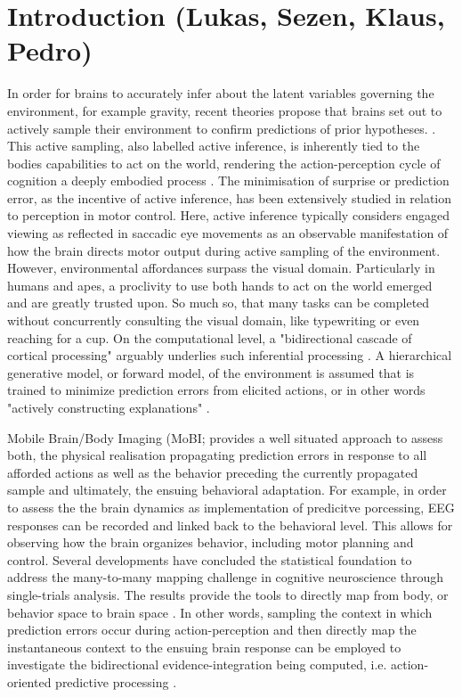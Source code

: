 \section{Introduction (Lukas, Sezen, Klaus, Pedro)}
In order for brains to accurately infer about the latent variables governing the environment, for example gravity, recent theories propose that brains set out to actively sample their environment to confirm predictions of prior hypotheses. \cites{Clark2013, Friston2010, Rao1999}. This active sampling, also labelled active inference, is inherently tied to the bodies capabilities to act on the world, rendering the action-perception cycle of cognition a deeply embodied process \cite{Friston2012}. The minimisation of surprise or prediction error, as the incentive of active inference, has been extensively studied in relation to perception in motor control. Here, active inference typically considers engaged viewing as reflected in saccadic eye movements as an observable manifestation of how the brain directs motor output during active sampling of the environment. However, environmental affordances surpass the visual domain. Particularly in humans and apes, a proclivity to use both hands to act on the world emerged and are greatly trusted upon. So much so, that many tasks can be completed without concurrently consulting the visual domain, like typewriting or even reaching for a cup. On the computational level, a "bidirectional cascade of cortical processing" arguably underlies such inferential processing \cite{Clark2013}. A hierarchical generative model, or forward model, of the environment is assumed that is trained to minimize prediction errors from elicited actions, or in other words "actively constructing explanations" \cite{Wolpert2011, Friston2018}. 

Mobile Brain/Body Imaging (MoBI; \cites{Gramann2011a, Gramann2014, Makeig2009} provides a well situated approach to assess both, the physical realisation propagating prediction errors in response to all afforded actions as well as the behavior preceding the currently propagated sample and ultimately, the ensuing behavioral adaptation. For example, in order to assess the the brain dynamics as implementation of predicitve porcessing, EEG responses can be recorded and linked back to the behavioral level. This allows for observing how the brain organizes behavior, including motor planning and control. Several developments have concluded the statistical foundation to address the many-to-many mapping challenge in cognitive neuroscience through single-trials analysis. The results provide the tools to directly map from body, or behavior space to brain space \cites{Pernet2011, Bridwell2018, Friston1994a, Blankertz2011}. In other words, sampling the context in which prediction errors occur during action-perception and then directly map the instantaneous context to the ensuing brain response can be employed to investigate the bidirectional evidence-integration being computed, i.e. action-oriented predictive processing \cite{Clark2013}.